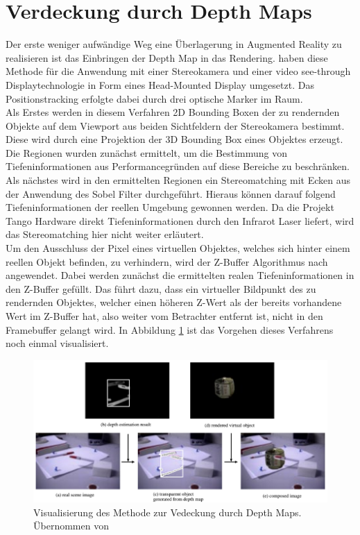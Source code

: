 \section{Verdeckung durch Depth Maps}

Der erste weniger aufwändige Weg eine Überlagerung in Augmented Reality zu realisieren ist das Einbringen der Depth Map in das Rendering. \citet{kanbara2000stereoscopic} haben diese Methode für die Anwendung mit einer Stereokamera und einer video see-through Displaytechnologie in Form eines Head-Mounted Display umgesetzt. Das Positionstracking erfolgte dabei durch drei optische Marker im Raum. \\

Als Erstes werden in diesem Verfahren 2D Bounding Boxen der zu rendernden Objekte auf dem Viewport aus beiden Sichtfeldern der Stereokamera bestimmt. Diese wird durch eine Projektion der 3D Bounding Box eines Objektes erzeugt. Die Regionen wurden zunächst ermittelt, um die Bestimmung von Tiefeninformationen aus Performancegründen auf diese Bereiche zu beschränken. Als nächstes wird in den ermittelten Regionen ein Stereomatching mit Ecken aus der Anwendung des Sobel Filter durchgeführt. Hieraus können darauf folgend Tiefeninformationen der reellen Umgebung gewonnen werden. \citep{kanbara2000stereoscopic} Da die Projekt Tango Hardware direkt Tiefeninformationen durch den Infrarot Laser liefert, wird das Stereomatching hier nicht weiter erläutert.   \\

Um den Ausschluss der Pixel eines virtuellen Objektes, welches sich hinter einem reellen Objekt befinden, zu verhindern, wird der Z-Buffer Algorithmus nach \citet{greene1993hierarchical} angewendet. Dabei werden zunächst die ermittelten realen Tiefeninformationen in den Z-Buffer gefüllt. Das führt dazu, dass ein virtueller Bildpunkt des zu rendernden Objektes, welcher einen höheren Z-Wert als der bereits vorhandene Wert im Z-Buffer hat, also weiter vom Betrachter entfernt ist, nicht in den Framebuffer gelangt wird. In Abbildung \ref{fig:stereo-depth-map} ist das Vorgehen dieses Verfahrens noch einmal visualisiert. \\

\begin{figure}
  \centering
	\includegraphics[width=1.0\textwidth]{content/images/methods/stereo-depth-map.png} 
  \caption{Visualisierung des Methode zur Vedeckung durch Depth Maps. Übernommen von \citet{kanbara2000stereoscopic}}
  \label{fig:stereo-depth-map}
\end{figure}


